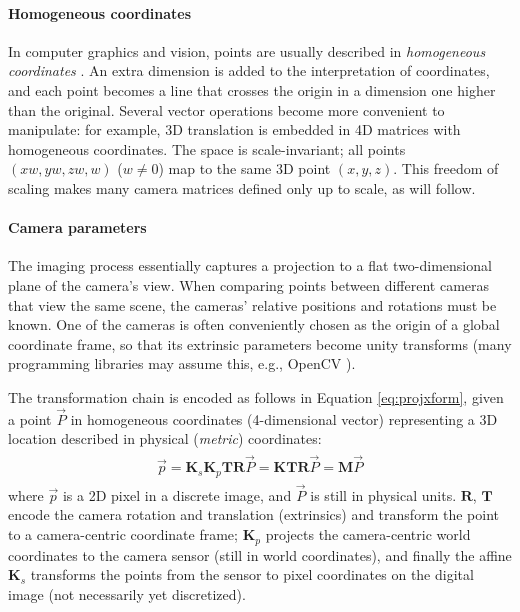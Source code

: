 
\paragraph{Homogeneous coordinates}
In computer graphics and vision, points are usually described in \emph{homogeneous coordinates} \cite{dubrofsky2009homography,hartley03multiview,heyden2005multiple}.
An extra dimension is added to the interpretation of coordinates, and each point becomes a line that crosses the origin in a dimension one higher than the original.
Several vector operations become more convenient to manipulate: for example, 3D translation is embedded in 4D matrices with homogeneous coordinates.
The space is scale-invariant; all points $(xw, yw, zw, w)$ ($w \neq 0$) map to the same 3D point $(x, y, z)$.
This freedom of scaling makes many camera matrices defined only up to scale, as will follow.


\paragraph{Camera parameters}
The imaging process essentially captures a projection to a flat two-dimensional plane of the camera's view.
When comparing points between different cameras that view the same scene, the cameras' relative positions and rotations must be known.
One of the cameras is often conveniently chosen as the origin of a global coordinate frame, so that its extrinsic parameters become unity transforms (many programming libraries may assume this, e.g., OpenCV \cite{opencv}).

The transformation chain \cite[p.~163]{hartley03multiview} is encoded as follows in Equation \ref{eq:projxform}, given a point $\vec P$ in homogeneous coordinates (4-dimensional vector) representing a 3D location described in physical (\emph{metric}) coordinates:
\begin{align} \label{eq:projxform} \begin{split}
	\vec p
	= \bm K_s \bm K_p \bm T \bm R \vec P
	= \bm K \bm T \bm R \vec P
	= \bm M \vec P
\end{split} \end{align}
where $\vec p$ is a 2D pixel in a discrete image, and $\vec P$ is still in physical units.
$\bm R$, $\bm T$ encode the camera rotation and translation (extrinsics) and transform the point to a camera-centric coordinate frame;
$\bm K_p$ projects the camera-centric world coordinates to the camera sensor (still in world coordinates), and finally the affine $\bm K_s$ transforms the points from the sensor to pixel coordinates on the digital image (not necessarily yet discretized).

